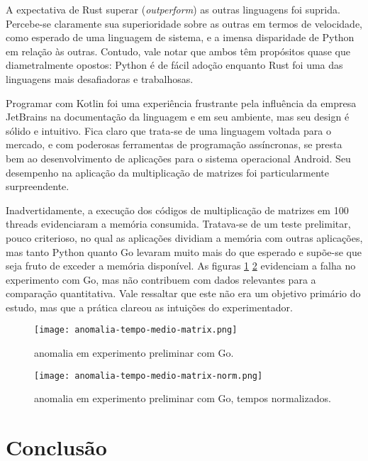 \documentclass[12pt,a4paper]{article}
\begin{document}
A expectativa de Rust superar (\emph{outperform}) as outras linguagens foi suprida. Percebe-se claramente sua superioridade sobre as outras em termos de velocidade, como esperado de uma linguagem de sistema, e a imensa disparidade de Python em relação às outras. Contudo, vale notar que ambos têm propósitos quase que diametralmente opostos: Python é de fácil adoção enquanto Rust foi uma das linguagens mais desafiadoras e trabalhosas.

Programar com Kotlin foi uma experiência frustrante pela influência da empresa JetBrains na documentação da linguagem e em seu ambiente, mas seu design é sólido e intuitivo. Fica claro que trata-se de uma linguagem voltada para o mercado, e com poderosas ferramentas de programação assíncronas, se presta bem ao desenvolvimento de aplicações para o sistema operacional Android. Seu desempenho na aplicação da multiplicação de matrizes foi particularmente surpreendente.

Inadvertidamente, a execução dos códigos de multiplicação de matrizes em 100 threads evidenciaram a memória consumida. Tratava-se de um teste prelimitar, pouco criterioso, no qual as aplicações dividiam a memória com outras aplicações, mas tanto Python quanto Go levaram muito mais do que esperado e supõe-se que seja fruto de exceder a memória disponível. As figuras \ref{fig:anomalia matrix GO} \ref{fig:anomalia matrix norm GO} evidenciam a falha no experimento com Go, mas não contribuem com dados relevantes para a comparação quantitativa. Vale ressaltar que este não era um objetivo primário do estudo, mas que a prática clareou as intuições do experimentador.


\begin{figure}[t] %
    \centering
    \texttt{[image: anomalia-tempo-medio-matrix.png]}
    \caption{anomalia em experimento preliminar com Go.}
    \label{fig:anomalia matrix GO}
\end{figure}

\begin{figure}[t] %
    \centering
    \texttt{[image: anomalia-tempo-medio-matrix-norm.png]}
    \caption{anomalia em experimento preliminar com Go, tempos normalizados.}
    \label{fig:anomalia matrix norm GO}
\end{figure}


\newpage
\section{Conclusão}
\label{sec:conclusao}
\end{document}
